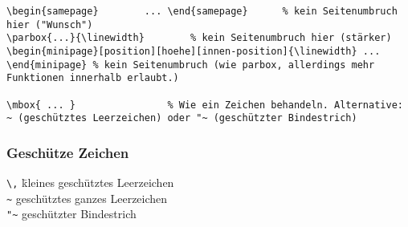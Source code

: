 %
\negAbstand
\begin{lstlisting}
\begin{samepage} 		... \end{samepage}		% kein Seitenumbruch hier ("Wunsch")
\parbox{...}{\linewidth}		% kein Seitenumbruch hier (stärker)
\begin{minipage}[position][hoehe][innen-position]{\linewidth} ... \end{minipage} % kein Seitenumbruch (wie parbox, allerdings mehr Funktionen innerhalb erlaubt.)

\mbox{ ... }				% Wie ein Zeichen behandeln. Alternative: ~ (geschütztes Leerzeichen) oder "~ (geschützter Bindestrich)
\end{lstlisting}

\subsubsection*{Geschütze Zeichen}
\begin{tabbing}
\lstinline|\,| \hspace{0.5em} \= kleines geschütztes Leerzeichen \\
\lstinline|~|		\> geschütztes ganzes Leerzeichen \\
\lstinline|"~|	\> geschützter Bindestrich 
\end{tabbing}
